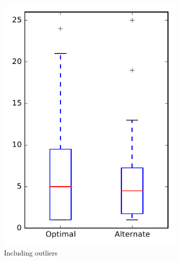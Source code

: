 
\begin{figure}
    \centering
    \begin{subfigure}{.4\textwidth}
        \centering
        \includegraphics[height=0.4\textheight]{figures/combo/dit_rq2_tika}
        \caption{Including outliers}\label{fig:combo:dit:rq2:tika_outlier}
    \end{subfigure}%
    \begin{subfigure}{.4\textwidth}
        \centering

\end{subfigure}
\end{figure}
